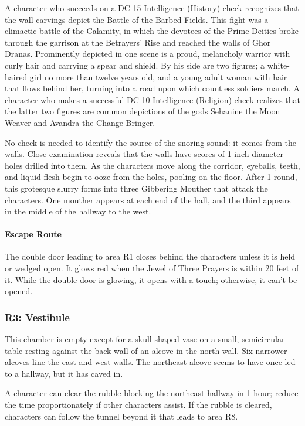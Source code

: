 \documentclass[10pt,a4paper,twoside,bg=print,twocolumn,openany,nodeprecatedcode]{dndbook}
\begin{document}
A character who succeeds on a DC 15 Intelligence (History) check recognizes that the wall carvings depict the Battle of the Barbed Fields. This fight was a climactic battle of the Calamity, in which the devotees of the Prime Deities broke through the garrison at the Betrayers' Rise and reached the walls of Ghor Dranas. Prominently depicted in one scene is a proud, melancholy warrior with curly hair and carrying a spear and shield. By his side are two figures; a white-haired girl no more than twelve years old, and a young adult woman with hair that flows behind her, turning into a road upon which countless soldiers march. A character who makes a successful DC 10 Intelligence (Religion) check realizes that the latter two figures are common depictions of the gods Sehanine the Moon Weaver and Avandra the Change Bringer.

No check is needed to identify the source of the snoring sound: it comes from the walls. Close examination reveals that the walls have scores of 1-inch-diameter holes drilled into them. As the characters move along the corridor, eyeballs, teeth, and liquid flesh begin to ooze from the holes, pooling on the floor. After 1 round, this grotesque slurry forms into three Gibbering Mouther that attack the characters. One mouther appears at each end of the hall, and the third appears in the middle of the hallway to the west.

\paragraph{Escape Route}
The double door leading to area R1 closes behind the characters unless it is held or wedged open. It glows red when the Jewel of Three Prayers is within 20 feet of it. While the double door is glowing, it opens with a touch; otherwise, it can't be opened.

\subsubsection{R3: Vestibule}
\begin{DndReadAloud}{}
This chamber is empty except for a skull-shaped vase on a small, semicircular table resting against the back wall of an alcove in the north wall. Six narrower alcoves line the east and west walls. The northeast alcove seems to have once led to a hallway, but it has caved in.

\end{DndReadAloud}

A character can clear the rubble blocking the northeast hallway in 1 hour; reduce the time proportionately if other characters assist. If the rubble is cleared, characters can follow the tunnel beyond it that leads to area R8.
\end{document}
